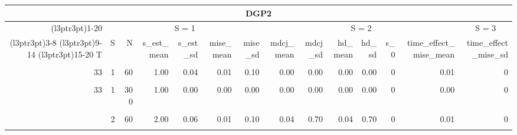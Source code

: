 \begin{table}
\centering
\begin{tabular}{rrrrrrrrrrrrrr}
\toprule
\multicolumn{20}{c}{DGP2} \\
\cmidrule(l{3pt}r{3pt}){1-20}
\multicolumn{2}{c}{ } & \multicolumn{6}{c}{S = 1} & \multicolumn{6}{c}{S = 2} & \multicolumn{6}{c}{S = 3} \\
\cmidrule(l{3pt}r{3pt}){3-8} \cmidrule(l{3pt}r{3pt}){9-14} \cmidrule(l{3pt}r{3pt}){15-20}
T & S & N & s\_est\_mean & s\_est\_sd & mise\_mean & mise\_sd & mdcj\_mean & mdcj\_sd & hd\_mean & hd\_sd & s\_0 & time\_effect\_mise\_mean & time\_effect\_mise\_sd\\
\midrule
\cellcolor{gray!6}{33} & \cellcolor{gray!6}{1} & \cellcolor{gray!6}{30} & \cellcolor{gray!6}{0.81} & \cellcolor{gray!6}{0.39} & \cellcolor{gray!6}{0.43} & \cellcolor{gray!6}{0.89} & \cellcolor{gray!6}{0.00} & \cellcolor{gray!6}{0.00} & \cellcolor{gray!6}{0.00} & \cellcolor{gray!6}{0.00} & \cellcolor{gray!6}{0} & \cellcolor{gray!6}{0.03} & \cellcolor{gray!6}{0}\\
33 & 1 & 60 & 1.00 & 0.04 & 0.01 & 0.10 & 0.00 & 0.00 & 0.00 & 0.00 & 0 & 0.01 & 0\\
\cellcolor{gray!6}{33} & \cellcolor{gray!6}{1} & \cellcolor{gray!6}{120} & \cellcolor{gray!6}{1.00} & \cellcolor{gray!6}{0.00} & \cellcolor{gray!6}{0.00} & \cellcolor{gray!6}{0.00} & \cellcolor{gray!6}{0.00} & \cellcolor{gray!6}{0.00} & \cellcolor{gray!6}{0.00} & \cellcolor{gray!6}{0.00} & \cellcolor{gray!6}{0} & \cellcolor{gray!6}{0.00} & \cellcolor{gray!6}{0}\\
33 & 1 & 300 & 1.00 & 0.00 & 0.00 & 0.00 & 0.00 & 0.00 & 0.00 & 0.00 & 0 & 0.00 & 0\\
\cellcolor{gray!6}{33} & \cellcolor{gray!6}{2} & \cellcolor{gray!6}{30} & \cellcolor{gray!6}{1.61} & \cellcolor{gray!6}{0.56} & \cellcolor{gray!6}{0.55} & \cellcolor{gray!6}{0.75} & \cellcolor{gray!6}{3.54} & \cellcolor{gray!6}{5.15} & \cellcolor{gray!6}{3.54} & \cellcolor{gray!6}{5.15} & \cellcolor{gray!6}{0} & \cellcolor{gray!6}{0.03} & \cellcolor{gray!6}{0}\\
\addlinespace
33 & 2 & 60 & 2.00 & 0.06 & 0.01 & 0.10 & 0.04 & 0.70 & 0.04 & 0.70 & 0 & 0.01 & 0\\
\cellcolor{gray!6}{33} & \cellcolor{gray!6}{2} & \cellcolor{gray!6}{120} & \cellcolor{gray!6}{2.00} & \cellcolor{gray!6}{0.00} & \cellcolor{gray!6}{0.00} & \cellcolor{gray!6}{0.00} & \cellcolor{gray!6}{0.00} & \cellcolor{gray!6}{0.00} & \cellcolor{gray!6}{0.00} & \cellcolor{gray!6}{0.00} & \cellcolor{gray!6}{0} & \cellcolor{gray!6}{0.00} & \cellcolor{gray!6}{0}\\

\end{tabular}
\end{table}
